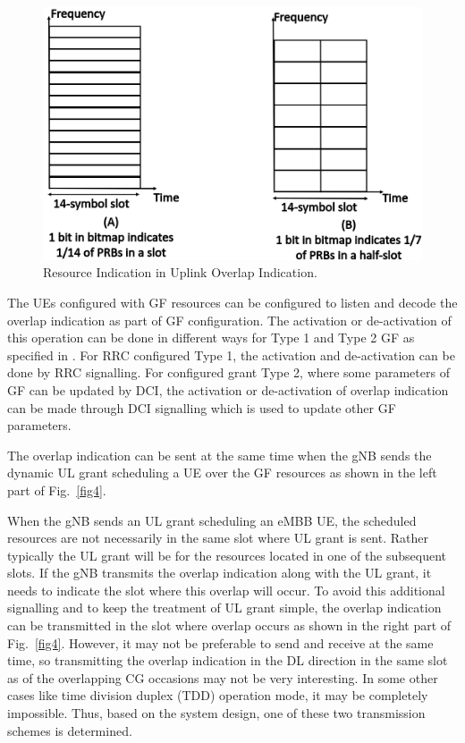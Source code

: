 \documentclass[conference]{IEEEtran}
\begin{document}
\begin{figure}[htbp]
\centerline{\includegraphics[scale=0.18]{fig3.png}}
\caption{Resource Indication in Uplink Overlap Indication.}
\label{fig3}
\vspace{-2mm}
\end{figure}

The UEs configured with GF resources can be configured to listen and decode the overlap indication as part of GF configuration. The activation or de-activation of this operation can be done in different ways for Type 1 and Type 2 GF as specified in \cite{ad4}. For RRC configured Type 1, the activation and de-activation can be done by RRC signalling. For configured grant Type 2, where some parameters of GF can be updated by DCI, the activation or de-activation of overlap indication can be made through DCI signalling which is used to update other GF parameters.

The overlap indication can be sent at the same time when the gNB sends the dynamic UL grant scheduling a UE over the GF resources as shown in the left part of Fig.~\ref{fig4}.

When the gNB sends an UL grant scheduling an eMBB UE, the scheduled resources are not necessarily in the same slot where UL grant is sent. Rather typically the UL grant will be for the resources located in one of the subsequent slots. If the gNB transmits the overlap indication along with the UL grant, it needs to indicate the slot where this overlap will occur. To avoid this additional signalling and to keep the treatment of UL grant simple, the overlap indication can be transmitted in the slot where overlap occurs as shown in the right part of Fig.~\ref{fig4}. However, it may not be preferable to send and receive at the same time, so transmitting the overlap indication in the DL direction in the same slot as of the overlapping CG occasions may not be very interesting. In some other cases like time division duplex (TDD) operation mode, it may be completely impossible. Thus, based on the system design, one of these two transmission schemes
is determined.
\end{document}
